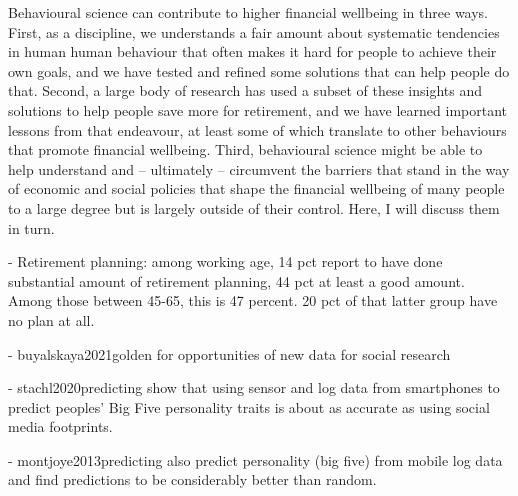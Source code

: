 Behavioural science can contribute to higher financial wellbeing in three ways.
First, as a discipline, we understands a fair amount about systematic
tendencies in human human behaviour that often makes it hard for people to
achieve their own goals, and we have tested and refined some solutions that can
help people do that. Second, a large body of research has used a subset of
these insights and solutions to help people save more for retirement, and we
have learned important lessons from that endeavour, at least some of which
translate to other behaviours that promote financial wellbeing. Third,
behavioural science might be able to help understand and -- ultimately --
circumvent the barriers that stand in the way of economic and social policies
that shape the financial wellbeing of many people to a large degree but is
largely outside of their control. Here, I will discuss them in turn.









- Retirement planning: among working age, 14 pct report to have done
substantial amount of retirement planning, 44 pct at least a good amount. Among
those between 45-65, this is 47 percent. 20 pct of that latter group have no
plan at all. 




- buyalskaya2021golden for opportunities of new data for social research

- stachl2020predicting show that using sensor and log data from smartphones to
predict peoples' Big Five personality traits is about as accurate as using
social media footprints.

- montjoye2013predicting also predict personality (big five) from mobile log
data and find predictions to be considerably better than random.



